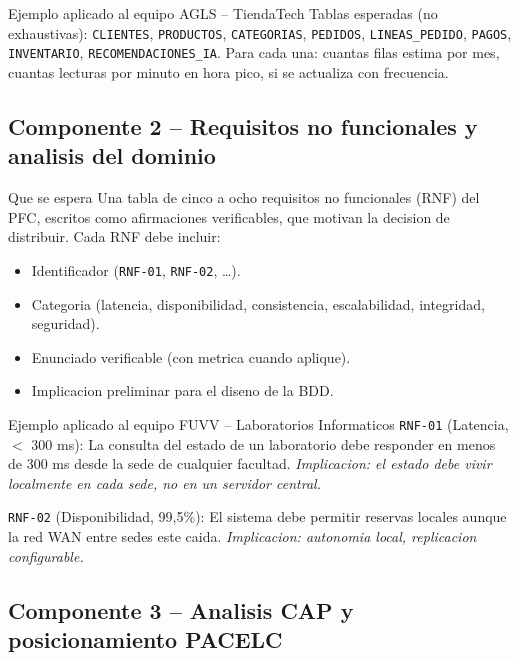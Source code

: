 \documentclass[11pt,a4paper]{article}
\newcommand{\codigo}[1]{\texttt{\textcolor{uteqBlue}{#1}}}
\begin{document}
\begin{cajaejemplo}{Ejemplo aplicado al equipo AGLS -- TiendaTech}
Tablas esperadas (no exhaustivas): \codigo{CLIENTES}, \codigo{PRODUCTOS}, \codigo{CATEGORIAS}, \codigo{PEDIDOS}, \codigo{LINEAS\_PEDIDO}, \codigo{PAGOS}, \codigo{INVENTARIO}, \codigo{RECOMENDACIONES\_IA}. Para cada una: cuantas filas estima por mes, cuantas lecturas por minuto en hora pico, si se actualiza con frecuencia.
\end{cajaejemplo}

\subsection{Componente 2 -- Requisitos no funcionales y analisis del dominio}

\begin{cajadefinicion}{Que se espera}
Una tabla de cinco a ocho requisitos no funcionales (RNF) del PFC, escritos como afirmaciones verificables, que motivan la decision de distribuir. Cada RNF debe incluir:
\begin{itemize}
\item Identificador (\codigo{RNF-01}, \codigo{RNF-02}, \ldots).
\item Categoria (latencia, disponibilidad, consistencia, escalabilidad, integridad, seguridad).
\item Enunciado verificable (con metrica cuando aplique).
\item Implicacion preliminar para el diseno de la BDD.
\end{itemize}
\end{cajadefinicion}

\begin{cajaejemplo}{Ejemplo aplicado al equipo FUVV -- Laboratorios Informaticos}
\codigo{RNF-01} (Latencia, $<$ 300 ms): La consulta del estado de un laboratorio debe responder en menos de 300 ms desde la sede de cualquier facultad. \emph{Implicacion: el estado debe vivir localmente en cada sede, no en un servidor central.}

\codigo{RNF-02} (Disponibilidad, 99,5\%): El sistema debe permitir reservas locales aunque la red WAN entre sedes este caida. \emph{Implicacion: autonomia local, replicacion configurable.}
\end{cajaejemplo}

\subsection{Componente 3 -- Analisis CAP y posicionamiento PACELC}
\end{document}
